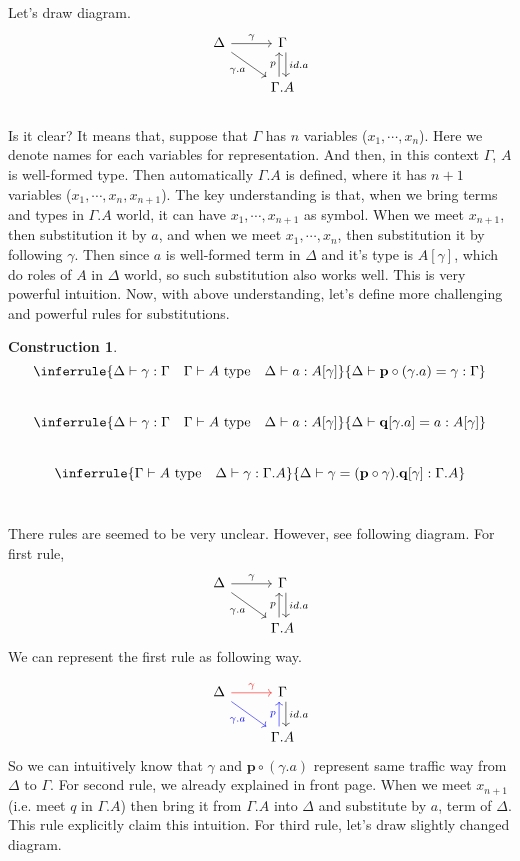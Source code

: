 \documentclass[12pt, letterpaper]{amsart}
\theoremstyle{definition}
\newtheorem{con}[thm]{Construction}
\theoremstyle{remark}
\theoremstyle{plain}
\numberwithin{equation}{section}
\begin{document}
Let's draw diagram. \\
\[
\begin{tikzcd}
    \Delta \arrow[r, "\gamma"] \arrow[rd, "\gamma.a"'] & \Gamma \arrow[d, "id.a", shift left]\\
    & \Gamma.A \arrow[u, "p", shift left]
\end{tikzcd}
\]
\\
Is it clear? It means that, suppose that $\Gamma$ has $n$ variables ($x_1, \cdots, x_n$). Here we denote names for each variables for representation. 
And then, in this context $\Gamma$, $A$ is well-formed type. Then automatically $\Gamma.A$ is defined, where 
it has $n+1$ variables ($x_1, \cdots, x_n, x_{n+1}$). The key understanding is that, when we bring 
terms and types in $\Gamma.A$ world, it can have $x_1, \cdots, x_{n+1}$ as symbol. When we meet $x_{n+1}$, then substitution it by $a$, and when we meet $x_1, \cdots, x_n$, then substitution it by following $\gamma$. 
Then since $a$ is well-formed term in $\Delta$ and it's type is $A[\gamma]$, which do roles of $A$ in $\Delta$ world, so such substitution also works well. This is very powerful intuition. 
Now, with above understanding, let's define more challenging and powerful rules for substitutions. 
\newpage 
\begin{con}

\[
\inferrule
{\Delta \vdash \gamma : \Gamma \quad \Gamma \vdash A \text{ type} \quad \Delta \vdash a : A[\gamma]}
{\Delta \vdash \mathbf{p} \circ (\gamma.a) = \gamma : \Gamma}
\]
\\
\[
\inferrule
{\Delta \vdash \gamma : \Gamma \quad \Gamma \vdash A \text{ type} \quad \Delta \vdash a : A[\gamma]}
{\Delta \vdash \mathbf{q}[\gamma.a] = a : A[\gamma]}
\]
\\
\[
\inferrule
{\Gamma \vdash A \text{ type} \quad \Delta \vdash \gamma : \Gamma.A}
{\Delta \vdash \gamma = (\mathbf{p}\circ \gamma).\mathbf{q}[\gamma] : \Gamma.A}
\]
\\
\end{con} 

There rules are seemed to be very unclear. However, see following diagram. For first rule, 
\[
\begin{tikzcd}
    \Delta \arrow[r, "\gamma"] \arrow[rd, "\gamma.a"'] & \Gamma \arrow[d, "id.a", shift left]\\
    & \Gamma.A \arrow[u, "p", shift left]
\end{tikzcd}
\]
We can represent the first rule as following way. 

\[
\begin{tikzcd}
    \Delta \arrow[r, "\gamma", red] \arrow[rd, "\gamma.a"', blue] & \Gamma \arrow[d, "id.a", shift left]\\
    & \Gamma.A \arrow[u, "p", shift left, blue]
\end{tikzcd}
\]
So we can intuitively know that $\gamma$ and $\mathbf{p} \circ (\gamma.a)$ represent same traffic way from $\Delta$ to $\Gamma$. 
For second rule, we already explained in front page. When we meet $x_{n+1}$ (i.e. meet $q$ in $\Gamma.A$) 
then bring it from $\Gamma.A$ into $\Delta$ and substitute by $a$, term of $\Delta$. This rule explicitly claim this intuition. 
For third rule, let's draw slightly changed diagram. 
\end{document}
